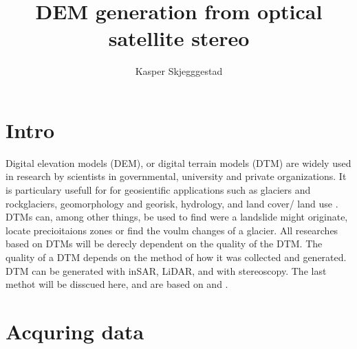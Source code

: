 \documentclass[a4paper,UKenglish]{article}
\title{DEM generation from optical satellite stereo}
\author{Kasper Skjegggestad}
\begin{document}
\maketitle
\tableofcontents

\section{Intro}

Digital elevation models (DEM), or digital terrain models (DTM) are widely used in research by scientists in governmental, university and private organizations. It is particulary usefull for for geosientific applications such as glaciers and rockglaciers, geomorphology and georisk, hydrology, and land cover/ land use \citep{toutin08}. DTMs can, among other things, be used to find were a landslide might originate, locate precioitaions zones or find the voulm changes of a glacier. All researches based on DTMs will be derecly dependent on the quality of the DTM. The quality of a DTM depends on the method of how it was collected and generated. DTM can be generated with inSAR, LiDAR, and with stereoscopy. The last methot will be disscued here, and are based on \cite{toutin08} and \cite{toutin01}. 

\section{Acquring data}
\end{document}
